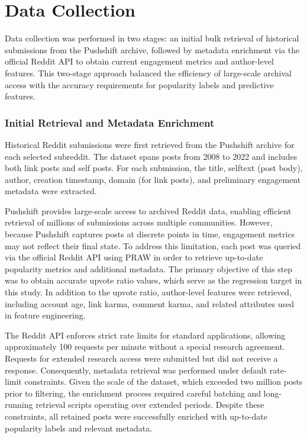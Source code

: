 \section{Data Collection}
\label{sec:data_collection}

Data collection was performed in two stages: an initial bulk retrieval of historical submissions from the Pushshift archive, followed by metadata enrichment via the official Reddit API to obtain current engagement metrics and author-level features. This two-stage approach balanced the efficiency of large-scale archival access with the accuracy requirements for popularity labels and predictive features.

\subsubsection*{Initial Retrieval and Metadata Enrichment}

Historical Reddit submissions were first retrieved from the Pushshift archive for each selected subreddit. The dataset spans posts from 2008 to 2022 and includes both link posts and self posts. For each submission, the title, selftext (post body), author, creation timestamp, domain (for link posts), and preliminary engagement metadata were extracted.

Pushshift provides large-scale access to archived Reddit data, enabling efficient retrieval of millions of submissions across multiple communities. However, because Pushshift captures posts at discrete points in time, engagement metrics may not reflect their final state. To address this limitation, each post was queried via the official Reddit API using PRAW in order to retrieve up-to-date popularity metrics and additional metadata. The primary objective of this step was to obtain accurate upvote ratio values, which serve as the regression target in this study. In addition to the upvote ratio, author-level features were retrieved, including account age, link karma, comment karma, and related attributes used in feature engineering.

The Reddit API enforces strict rate limits for standard applications, allowing approximately 100 requests per minute without a special research agreement. Requests for extended research access were submitted but did not receive a response. Consequently, metadata retrieval was performed under default rate-limit constraints. Given the scale of the dataset, which exceeded two million posts prior to filtering, the enrichment process required careful batching and long-running retrieval scripts operating over extended periods. Despite these constraints, all retained posts were successfully enriched with up-to-date popularity labels and relevant metadata.

